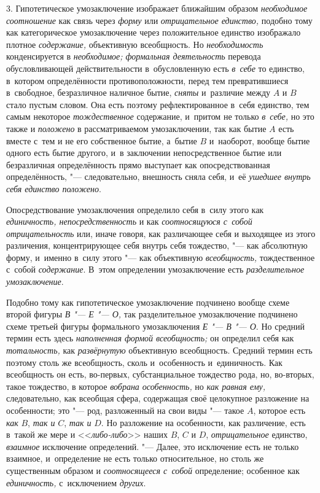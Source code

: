 3. Гипотетическое умозаключение изображает ближайшим образом
{\em необходимое соотношение}
как связь через {\em форму} или {\em отрицательное единство,}
подобно тому как категорическое умозаключение через
положительное единство изображало плотное
{\em содержание,} объективную всеобщность. Но {\em необходимость}
конденсируется в {\em необходимое; формальная деятельность}
перевода обусловливающей действительности в~обусловленную есть {\em в~себе} то
единство, в~котором определённости противоположности, перед тем
превратившиеся в~свободное, безразличное наличное бытие,
{\em сняты} и~различие между $A$ и $B$ стало пустым
словом. Она есть поэтому рефлектированное в~себя единство,
тем самым некоторое {\em тождественное}
содержание, и~притом не только {\em в~себе,} но это также и {\em положено} в
рассматриваемом умозаключении, так как бытие $A$ есть вместе с~тем
и не его собственное бытие, а~бытие $B$ и~наоборот,
вообще бытие одного есть бытие другого, и~в заключении непосредственное
бытие или безразличная определённость прямо выступает как опосредствованная
определённость, "--- следовательно, внешность сняла себя, и~её
{\em ушедшее внутрь себя единство положено}.

Опосредствование умозаключения определило себя в~силу этого
как {\em единичность, непосредственность} и
как {\em соотносящуюся с~собой
отрицательность} или, иначе говоря, как различающее себя и
выходящее из этого различения, концентрирующее себя внутрь себя тождество,
"--- как абсолютную форму, и~именно в~силу этого "--- как объективную
{\em всеобщность,} тождественное с~собой {\em содержание}. В~этом
определении умозаключение есть {\em разделительное умозаключение}.


Подобно тому как гипотетическое умозаключение подчинено вообще
схеме второй фигуры {\em В "--- Е "--- О,} так разделительное
умозаключение подчинено схеме третьей фигуры формального умозаключения
{\em Е "--- В "--- О}. Но средний термин есть здесь
{\em наполненная формой всеобщность;}
он определил себя как {\em тотальность,} как {\em развёрнутую}
объективную всеобщность. Средний термин есть поэтому столь же
всеобщность, сколь и~особенность и~единичность. Как всеобщность он есть,
во-первых, субстанциальное тождество рода, но, во-вторых, такое тождество,
в которое {\em вобрана особенность,} но {\em как равная ему,}
следовательно, как всеобщая сфера, содержащая своё целокупное
разложение на особенности; это "--- род, разложенный на свои
виды "--- такое $A$,
которое есть {\em как} $B$, {\em так и} $C$, {\em так и} $D$. Но
разложение на особенности, как различение, есть в~такой же мере и
<<{\em либо-либо}>> наших $B$, $C$ и $D$, {\em отрицательное}
единство, {\em взаимное} исключение определений. "--- Далее, это
исключение есть не только взаимное, и~определение не есть только
относительное, но столь же существенным образом и {\em соотносящееся с~собой}
определение; особенное как {\em единичность,} с~исключением {\em других}.

